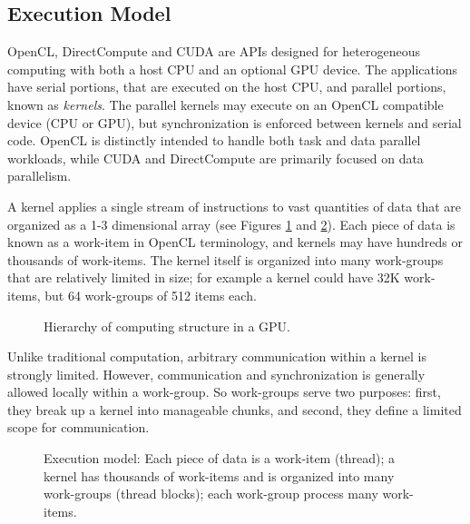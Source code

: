 \documentclass[prodmode,acmtecs]{acmsmall}
\begin{document}
\subsection{Execution Model}

OpenCL, DirectCompute and CUDA are APIs designed for heterogeneous computing with both a host CPU and an optional GPU device. The applications have serial portions, that are executed on the host CPU, and parallel portions, known as \textit{kernels}. The parallel kernels may execute on an OpenCL compatible device (CPU or GPU), but synchronization is enforced between kernels and serial code. OpenCL is distinctly intended to handle both task and data parallel workloads, while CUDA and DirectCompute are primarily focused on data parallelism. 

A kernel applies a single stream of instructions to vast quantities of data that are organized as a 1-3 dimensional array (see Figures \ref{figure:captura1paperCEC} and \ref{figure:grid}). Each piece of data is known as a work-item in OpenCL terminology, and kernels may have hundreds or thousands of work-items. The kernel itself is organized into many work-groups that are relatively limited in size; for example a kernel could have 32K work-items, but 64 work-groups of 512 items each. 

\begin{figure}[ht]
\centerline{}
\caption{Hierarchy of computing structure in a GPU.}
\label{figure:captura1paperCEC}
\end{figure}

Unlike traditional computation, arbitrary communication within a kernel is strongly limited. However, communication and synchronization is generally allowed locally within a work-group. So work-groups serve two purposes: first, they break up a kernel into manageable chunks, and second, they define a limited scope for communication. 

\begin{figure}[ht]
\centerline{}
\caption{Execution model: Each piece of data is a work-item (thread); a kernel has thousands of work-items and is organized into many work-groups (thread blocks); each work-group process many work-items.}
\label{figure:grid}
\end{figure}

\end{document}
